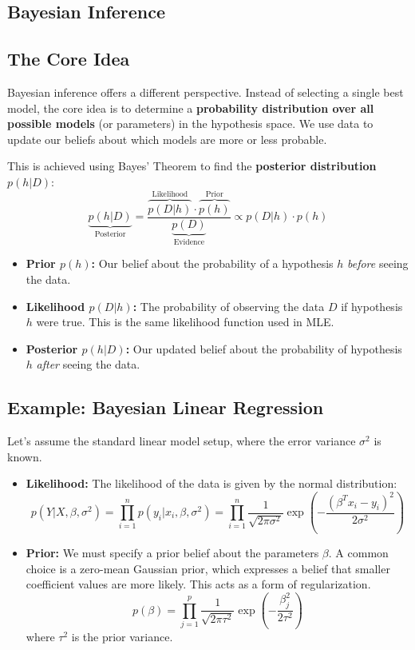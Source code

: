 \documentclass{article}
\begin{document}
\begin{multicols}{2}
	\section{Bayesian Inference}
	\subsection{The Core Idea}
	Bayesian inference offers a different perspective. Instead of selecting a single best model, the core idea is to determine a \textbf{probability distribution over all possible models} (or parameters) in the hypothesis space. We use data to update our beliefs about which models are more or less probable.

	This is achieved using Bayes' Theorem to find the \textbf{posterior distribution} $p(h|D)$:
	$$ \underbrace{p(h|D)}_{\text{Posterior}} = \frac{\overbrace{p(D|h)}^{\text{Likelihood}} \cdot \overbrace{p(h)}^{\text{Prior}}}{\underbrace{p(D)}_{\text{Evidence}}} \propto p(D|h) \cdot p(h) $$
	\begin{itemize}
		\item \textbf{Prior $p(h)$:} Our belief about the probability of a hypothesis $h$ \textit{before} seeing the data.
		\item \textbf{Likelihood $p(D|h)$:} The probability of observing the data $D$ if hypothesis $h$ were true. This is the same likelihood function used in MLE.
		\item \textbf{Posterior $p(h|D)$:} Our updated belief about the probability of hypothesis $h$ \textit{after} seeing the data.
	\end{itemize}

	\subsection{Example: Bayesian Linear Regression}
	Let's assume the standard linear model setup, where the error variance $\sigma^2$ is known.
	\begin{itemize}
		\item \textbf{Likelihood:} The likelihood of the data is given by the normal distribution:
		      $$ p(Y|X, \beta, \sigma^2) = \prod_{i=1}^{n} p(y_i|x_i, \beta, \sigma^2) = \prod_{i=1}^{n} \frac{1}{\sqrt{2\pi\sigma^2}} \exp\left(-\frac{(\beta^T x_i - y_i)^2}{2\sigma^2}\right) $$
		\item \textbf{Prior:} We must specify a prior belief about the parameters $\beta$. A common choice is a zero-mean Gaussian prior, which expresses a belief that smaller coefficient values are more likely. This acts as a form of regularization.
		      $$ p(\beta) = \prod_{j=1}^{p} \frac{1}{\sqrt{2\pi\tau^2}} \exp\left(-\frac{\beta_j^2}{2\tau^2}\right) $$
		      where $\tau^2$ is the prior variance.
	\end{itemize}


\end{multicols}
\end{document}

